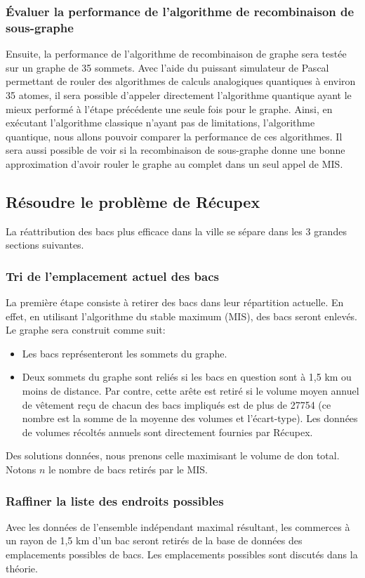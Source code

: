 \documentclass[11pt]{article}
\begin{document}
\subsubsection{Évaluer la performance de l'algorithme de recombinaison de sous-graphe}
Ensuite, la performance de l'algorithme de recombinaison de graphe sera testée sur un graphe de 35 sommets. Avec l'aide du puissant simulateur de Pascal permettant de rouler des algorithmes de calculs analogiques quantiques à environ 35 atomes, il sera possible d'appeler directement l'algorithme quantique ayant le mieux performé à l'étape précédente une seule fois pour le graphe. Ainsi, en exécutant l'algorithme classique n'ayant pas de limitations, l'algorithme quantique, nous allons pouvoir comparer la performance de ces algorithmes. Il sera aussi possible de voir si la recombinaison de sous-graphe donne une bonne approximation d'avoir rouler le graphe au complet dans un seul appel de MIS.

\subsection{Résoudre le problème de Récupex}
La réattribution des bacs plus efficace dans la ville se sépare dans les 3 grandes sections suivantes.

\subsubsection{Tri de l'emplacement actuel des bacs}
La première étape consiste à retirer des bacs dans leur répartition actuelle. En effet, en utilisant l'algorithme du stable maximum (MIS), des bacs seront enlevés. Le graphe sera construit comme suit:
\begin{itemize}
    \item Les bacs représenteront les sommets du graphe.
    \item Deux sommets du graphe sont reliés si les bacs en question sont à 1,5 km ou moins de distance. Par contre, cette arête est retiré si le volume moyen annuel de vêtement reçu de chacun des bacs impliqués est de plus de 27754 (ce nombre est la somme de la moyenne des volumes et l'écart-type). Les données de volumes récoltés annuels sont directement fournies par Récupex.
\end{itemize}
Des solutions données, nous prenons celle maximisant le volume de don total. Notons $n$ le nombre de bacs retirés par le MIS.

\subsubsection{Raffiner la liste des endroits possibles}
Avec les données de l’ensemble indépendant maximal résultant, les commerces à un rayon de 1,5 km d'un bac seront retirés de la base de données des emplacements possibles de bacs. Les emplacements possibles sont discutés dans la théorie.
\end{document}
